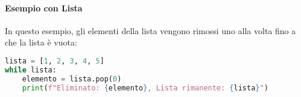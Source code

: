\paragraph{Esempio con Lista}
In questo esempio, gli elementi della lista vengono rimossi uno alla volta fino a che la lista è vuota:
\begin{lstlisting}[language=Python]
lista = [1, 2, 3, 4, 5]
while lista:
    elemento = lista.pop(0)
    print(f"Eliminato: {elemento}, Lista rimanente: {lista}")
\end{lstlisting}

